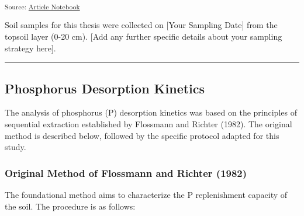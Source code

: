\documentclass[
  letterpaper,
  DIV=11,
  numbers=noendperiod]{scrartcl}
\begin{document}
\textsubscript{Source:
\href{https://Andrapodon.github.io/Master-Thesis-P-kinetics/index.qmd.html}{Article
Notebook}}

Soil samples for this thesis were collected on {[}Your Sampling Date{]}
from the topsoil layer (0-20 cm). {[}Add any further specific details
about your sampling strategy here{]}.

\begin{center}\rule{0.5\linewidth}{0.5pt}\end{center}

\subsection{Phosphorus Desorption
Kinetics}\label{phosphorus-desorption-kinetics}

The analysis of phosphorus (P) desorption kinetics was based on the
principles of sequential extraction established by Flossmann and Richter
(1982). The original method is described below, followed by the specific
protocol adapted for this study.

\subsubsection{Original Method of Flossmann and Richter
(1982)}\label{original-method-of-flossmann-and-richter-1982}

The foundational method aims to characterize the P replenishment
capacity of the soil. The procedure is as follows:
\end{document}
